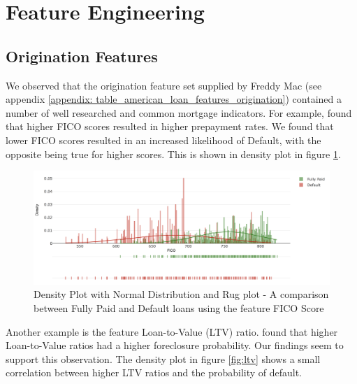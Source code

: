     \section{Feature Engineering} \label{sec: Feature_Engineering}
    
    
        \subsection{Origination Features}
        
            We observed that the origination feature set supplied by Freddy Mac (see appendix \ref{appendix: table_american_loan_features_origination}) contained a number of well researched and common mortgage indicators. For example, \cite{default_risk_2005} found that higher FICO scores resulted in higher prepayment rates. We found that lower FICO scores resulted in an increased likelihood of Default, with the opposite being true for higher scores. This is shown in density plot in figure \ref{fig:FICO_score}. 
            
            \begin{figure}[H]
                \centering
                \hspace*{-0.5cm}\includegraphics[width=1.1\textwidth]{Images/fico_dist.png}
                \caption{Density Plot with Normal Distribution and Rug plot - A comparison between Fully Paid and Default loans using the feature FICO Score}
                \label{fig:FICO_score}
            \end{figure}
            
            Another example is the feature Loan-to-Value (LTV) ratio. \cite{foreclosure_single_family_1998} found that higher Loan-to-Value ratios had a higher foreclosure probability. Our findings seem to support this observation. The density plot in figure \ref{fig:ltv} shows a small correlation between higher LTV ratios and the probability of default. 
            
